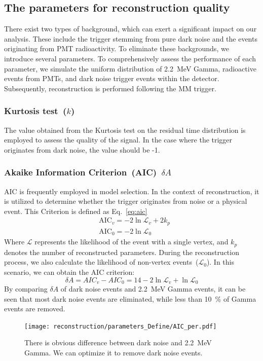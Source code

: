 \subsection{The parameters for reconstruction quality}
There exist two types of background, which can exert a significant impact on our analysis. These include the trigger stemming from pure dark noise and the events originating from PMT radioactivity. To eliminate these backgrounds, we introduce several parameters. To comprehensively assess the performance of each parameter, we simulate the uniform distribution of \SI{2.2}{MeV} Gamma, radioactive events from PMTs, and dark noise trigger events within the detector. Subsequently, reconstruction is performed following the MM trigger.

\subsubsection{Kurtosis test~($k$)}
The value obtained from the Kurtosis test on the residual time distribution is employed to assess the quality of the signal. In the case where the trigger originates from dark noise, the value should be -1.

\subsubsection{Akaike Information Criterion~(AIC)~$\delta A$}
AIC is frequently employed in model selection. In the context of reconstruction, it is utilized to determine whether the trigger originates from noise or a physical event. This Criterion is defined as Eq.~\eqref{eq:aic}
\begin{equation}
	\begin{aligned}
		 & \text{AIC}_v = -2 \ln \mathcal{L}_v + 2k_p \\
		 & \text{AIC}_0 = -2 \ln \mathcal{L}_0
	\end{aligned}
	\label{eq:aic}
\end{equation}
Where $\mathcal{L}$ represents the likelihood of the event with a single vertex, and $k_p$ denotes the number of reconstructed parameters. During the reconstruction process, we also calculate the likelihood of non-vertex events~($\mathcal{L}_0$). In this scenario, we can obtain the AIC criterion:
\begin{equation}
	\delta A = AIC_v - AIC_0 = 14 - 2\ln \mathcal{L}_v + \ln \mathcal{L}_0
	\label{eq:daic}
\end{equation}
By comparing $\delta A$ of dark noise events and \SI{2.2}{MeV} Gamma events, it can be seen that most dark noise events are eliminated, while less than \SI{10}{\%} of Gamma events are removed.
\begin{figure}
	\centering
	\texttt{[image: reconstruction/parameters\_Define/AIC\_per.pdf]}
	\caption{There is obvious difference between dark noise and
		\SI{2.2}{MeV} Gamma. We can optimize it to remove dark noise events.}
\end{figure}

